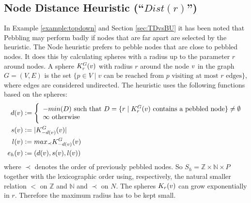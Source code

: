 \subsection{Node Distance Heuristic (``$Dist(r)$'')}
\label{sec:distance}

In Example \ref{example:topdown} and Section \ref{sec:TDvsBU} it has been noted that  Pebbling may perform badly if nodes that are far apart are selected by the heuristic.
The Node  heuristic prefers to pebble nodes that are close to pebbled nodes. It does this by calculating spheres with a radius up to the parameter $r$ around nodes.
A sphere $K_r^{G}(v)$ with radius $r$ around the node $v$ in the graph $G = (V,E)$ is the set $\{p \in V \mid v \text{ can be reached from } p \text{ visiting at most } r \text{ edges}\}$, where edges are considered undirected. 
The heuristic uses the following functions based on the spheres:
\begin{align*}
	d(v) &\mathrel{\mathop:}= \Bigg\{
	\begin{array}{l}
		-min(D) \text{ such that } D = \{r \mid K_r^{G}(v)\text{ contains a pebbled node}\} \neq \emptyset\\
		\infty \text{ otherwise}
		\end{array}\\
	s(v) &\mathrel{\mathop:}= |K_{-d(v)}^G(v)|\\
	l(v) &\mathrel{\mathop:}= max_{\prec}K_{-d(v)}^G(v)\\
	e_h(v) &\mathrel{\mathop:}= (d(v),s(v),l(v))
\end{align*}
where $\prec$ denotes the order of previously pebbled nodes.
So $S_h = \mathbb{Z} \times \mathbb{N} \times P$ together with the lexicographic order using, respectively, the natural smaller relation $<$ on $\mathbb{Z}$ and $\mathbb{N}$ and $\prec$ on $N$. The spheres $K_r(v)$ can grow exponentially in $r$. Therefore the maximum radius has to be kept small.

